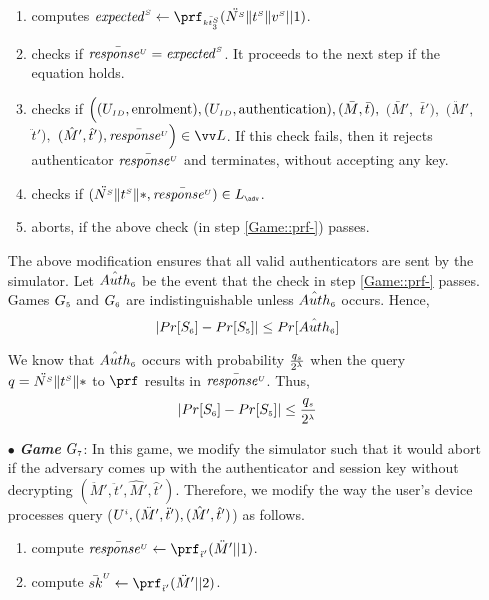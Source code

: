 \begin{itemize}
\begin{enumerate}
%
\item computes $\VS{\mathit{expected}} \gets \prf_{\sss\bar{\VS{\keyt_{\sss3}}}}(\ddot{\VS{\nonce}}  \| \VS{\trans} \| \VS{\verifier}||1)$.
%
\item checks if $\bar{\mathit{response}^{\scriptscriptstyle U}}=\mathit{expected}^{\scriptscriptstyle S}$. It proceeds to the next step if the equation holds. 
%
\item\label{Game::check-sim-} checks if $\Big((U_{\scriptscriptstyle  ID},  \text{enrolment}), (U_{\scriptscriptstyle  ID},  \text{authentication}), (\bar M, \bar t),$ $ (\bar M',$ $ \bar t'),$ $ (\ddot M', $ $\ddot t'), $ $(\hat M', \hat t'), \bar{\VC{\mathit{response}}}\Big)\in \vv L$. If this check fails, then it rejects authenticator  $\bar{\mathit{response}^{\scriptscriptstyle U}}$ and terminates, without accepting any key.

\item\label{Game::prf-} checks if $(\ddot{\VS{\nonce}}  \| \VS{\trans} \| *,\bar{\VC{\mathit{response}}})\in L_{\sss \adv}$.  
%
\item aborts, if the above check (in step \ref{Game::prf-}) passes.
%
\end{enumerate}

The above modification ensures that all valid authenticators are sent by the simulator. Let $\hat {Auth}_{\scriptscriptstyle  6}$ be the event that the check in step \ref{Game::prf-} passes. Games $G_{\scriptscriptstyle  5}$ and $G_{\scriptscriptstyle  6}$ are indistinguishable unless $\hat {Auth}_{\scriptscriptstyle  6}$ occurs. Hence,
%
$$|Pr[S_{\scriptscriptstyle  6}]-Pr[S_{\scriptscriptstyle  5}]|\leq Pr[\hat {Auth}_{\scriptscriptstyle  6}]$$


We know that $\hat {Auth}_{\scriptscriptstyle  6}$ occurs with probability $ \frac{q_{\scriptscriptstyle  s}}{2^{\scriptscriptstyle \lambda}}$ when the query $q=\ddot{{N}^{\scriptscriptstyle S}}  \| {t}^{\scriptscriptstyle S} \| *$ to $\prf$ results in $\bar{\mathit{response}^{\scriptscriptstyle U}}$. Thus, 
%
\begin{equation}\label{eq::game_6}
|Pr[S_{\scriptscriptstyle  6}]-Pr[S_{\scriptscriptstyle  5}]|\leq \frac{q_{\scriptscriptstyle  s}}{2^{\scriptscriptstyle \lambda}}
\end{equation}

\item[$\bullet$] \textit{\textbf{Game}}  $G_{\scriptscriptstyle  7}$: In this game, we modify the simulator such that it would abort if the adversary comes up with the authenticator and session key without decrypting  $ (\ddot M', \ddot t', \hat M', \hat t')$.  Therefore, we modify  the way the user's device processes query \send($U^{\scriptscriptstyle  i}, (\ddot M', \ddot t'), (\hat M', \hat t')$) as follows.
 \begin{enumerate}
 \item compute $\bar{\VC{\mathit{response}}} \gets \prf_{\sss  \ddot t'}( \ddot M'|| 1)$.
 \item compute $\bar {sk}^{\sss U}\gets \prf_{\sss  \ddot t'}( \ddot M'|| 2)$.
 \end{enumerate}


\end{itemize}
